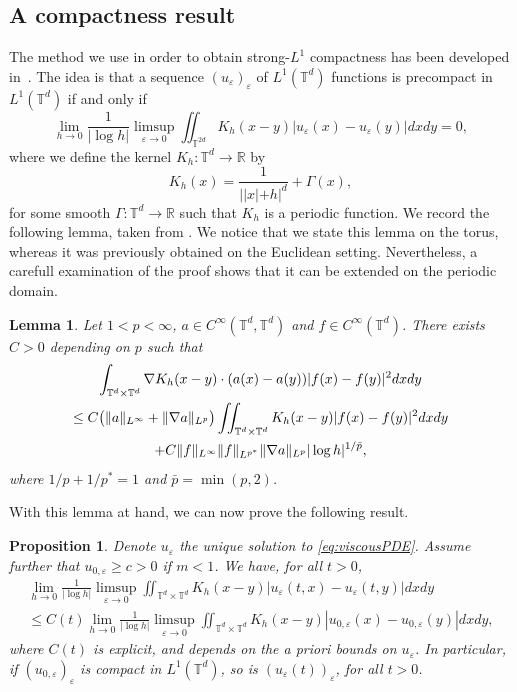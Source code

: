 \documentclass[11pt]{article}
\newtheorem{prop}[thm]{Proposition}
\newtheorem{lemma}[thm]{Lemma}
\numberwithin{equation}{section} %
\newcommand{\R}{{\mathbb{R}}}
\newcommand{\T}{{\mathbb{T}}}
\newcommand{\ep}{\varepsilon}
\let\div\relax
\DeclareMathOperator{\div}{\mathsf{div}}
\def \ep{\varepsilon}
\def\nab{\nabla}
\begin{document}
\subsection{A compactness result}\label{subsec:compactness}

The method we use in order to obtain strong-$L^1$ compactness has been developed in~\cite{belgacemjabin2013}. The idea is that a sequence $(u_\ep)_\ep$ of $L^1(\T^d)$ functions is precompact in $L^1(\T^d)$ if and only if
\begin{equation*}
    \lim_{h\to 0}\frac{1}{|\log h|} \limsup_{\ep\to 0} \iint_{\T^{2d}} K_h(x-y) |u_\ep(x)-u_\ep(y)|dxdy = 0,
\end{equation*}
where we define the kernel $K_h:\T^d\to \R$ by
\begin{equation*}
        K_h(x) = \frac{1}{||x|+h|^d} + \Gamma(x),
\end{equation*}
for some smooth $\Gamma :\T^d\to \R$ such that $K_h$ is a periodic function.
We record the following lemma, taken from \cite[Proposition 4.1]{belgacemjabin2013}. We notice that we state this lemma on the torus, whereas it was previously obtained on the Euclidean setting. Nevertheless, a carefull examination of the proof shows that it can be extended on the periodic domain.
\begin{lemma}\label{ineq:CZO}
    Let $1<p<\infty$, $a\in C^\infty(\T^d,\T^d)$ and $f\in C^\infty(\T^d)$. There exists $C>0$ depending on $p$ such that
    \begin{multline*}
        \int_{\T^d\times \T^d}\nab K_h(x-y) \cdot (a(x)-a(y)) |f(x)-f(y)|^2 dxdy \\
        \le C \big(\|\div a\|_{L^\infty} +\|\nab a\|_{L^p}\big)\iint_{\T^d\times \T^d} K_h(x-y) |f(x)-f(y)|^2dxdy \\
        +C \|f\|_{L^\infty} \|f\|_{L^{p^*}} \|\nab a\|_{L^p}|\log h|^{1/\bar p},
    \end{multline*}
    where $ 1/p+1/{p^*}=1$ and $\bar p = \min (p,2)$.
\end{lemma}
With this lemma at hand, we can now prove the following result.
\begin{prop}\label{prop:compactness}
    Denote $u_\ep$ the unique solution to \eqref{eq:viscousPDE}. Assume further that $u_{0,\ep}\ge c>0$ if $m<1$. We have, for all $t>0$,
    \begin{multline*}
        \lim_{h\to 0}\frac{1}{|\log h|}\limsup_{\ep \to 0} \iint_{\T^d\times\T^d}K_h(x-y) |u_\ep(t,x) - u_\ep(t,y)|dxdy \\
        \le C(t) \lim_{h\to 0}\frac{1}{|\log h|}\limsup_{\ep \to 0} \iint_{\T^d\times\T^d}K_h(x-y) |u_{0,\ep}(x) - u_{0,\ep}(y)|dxdy,
    \end{multline*}
    where $C(t)$ is explicit, and depends on the a priori bounds on $u_\ep$. In particular, if $(u_{0,\ep})_\ep$ is compact in $L^1(\T^d)$, so is $(u_\ep(t))_\ep$, for all $t>0$.
\end{prop}
\end{document}
